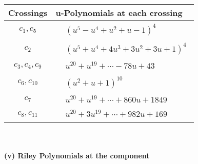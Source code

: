 \documentclass[1p]{elsarticle_modified}
\theoremstyle{definition}
\begin{document}
\begin{tabular}{m{50pt}|m{274pt}}
Crossings & \hspace{64pt}u-Polynomials at each crossing \\
\hline $$\begin{aligned}c_{1},c_{5}\end{aligned}$$&$\begin{aligned}
&(u^5- u^4+u^2+u-1)^4
\end{aligned}$\\
\hline $$\begin{aligned}c_{2}\end{aligned}$$&$\begin{aligned}
&(u^5+u^4+4 u^3+3 u^2+3 u+1)^4
\end{aligned}$\\
\hline $$\begin{aligned}c_{3},c_{4},c_{9}\end{aligned}$$&$\begin{aligned}
&u^{20}+u^{19}+\cdots-78 u+43
\end{aligned}$\\
\hline $$\begin{aligned}c_{6},c_{10}\end{aligned}$$&$\begin{aligned}
&(u^2+u+1)^{10}
\end{aligned}$\\
\hline $$\begin{aligned}c_{7}\end{aligned}$$&$\begin{aligned}
&u^{20}+u^{19}+\cdots+860 u+1849
\end{aligned}$\\
\hline $$\begin{aligned}c_{8},c_{11}\end{aligned}$$&$\begin{aligned}
&u^{20}+3 u^{19}+\cdots+982 u+169
\end{aligned}$\\
\hline
\end{tabular}\\~\\
\newpage\renewcommand{\arraystretch}{1}
\flushleft \textbf{(v) Riley Polynomials at the component}\newline \\
\end{document}
